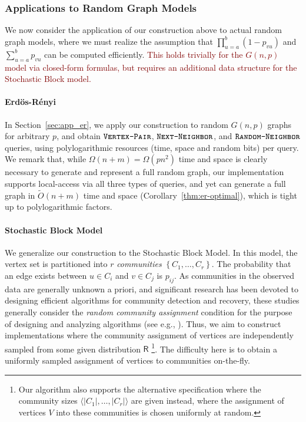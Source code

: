 \subsubsection{Applications to Random Graph Models}
\label{sec:applications_to_random_graph_models}
We now consider the application of our construction above to actual random graph models,
where we must realize the assumption that $\prod^{b}_{u=a} (1-p_{vu})$ and $\sum^{b}_{u=a} p_{vu}$ can be computed efficiently.
\textcolor{Maroon}
{This holds trivially for the $G(n,p)$ model via closed-form formulas, but requires an additional data structure for the Stochastic Block model.}


\paragraph*{Erd\"{o}s-R\'{e}nyi}
\label{par:erdos_renyi}
In Section~\ref{sec:app_er}, we apply our construction to random $G(n,p)$ graphs for arbitrary $p$, and obtain $\texttt{\textsc{Vertex-Pair}}$,
$\texttt{\textsc{Next-Neighbor}}$, and $\texttt{\textsc{Random-Neighbor}}$ queries, using polylogarithmic resources (time, space and random bits) per query.
We remark that, while $\Omega(n+m) = \Omega(p n^2)$ time and space is clearly necessary to generate and represent a full random graph,
our implementation supports local-access via all three types of queries, and yet can generate a full graph in $\widetilde{O}(n+m)$ time and space
(Corollary~\ref{thm:er-optimal}), which is tight up to polylogarithmic factors.


\paragraph*{Stochastic Block Model}
\label{par:stochastic_block_model}
We generalize our construction to the Stochastic Block Model.
In this model, the vertex set is partitioned into $r$ \emph{communities} $\left\{ C_1, \ldots, C_r \right\}$.
The probability that an edge exists between $u\in C_i$ and $v \in C_j$ is $p_{ij}$.
As communities in the observed data are generally unknown a priori,
and significant research has been devoted to designing efficient algorithms for community detection and recovery, these studies generally consider
the \emph{random community assignment} condition for the purpose of designing and analyzing algorithms (see e.g., \cite{mossel2015reconstruction}).
Thus, we aim to construct implementations where the community assignment of vertices are independently sampled from some given distribution $\mathsf{R}$
\footnote{Our algorithm also supports the alternative specification where the community sizes $\langle |C_1|, \ldots, |C_r|\rangle$
are given instead, where the assignment of vertices $V$ into these communities is chosen uniformly at random.}.
The difficulty here is to obtain a uniformly sampled assignment of vertices to communities on-the-fly.

